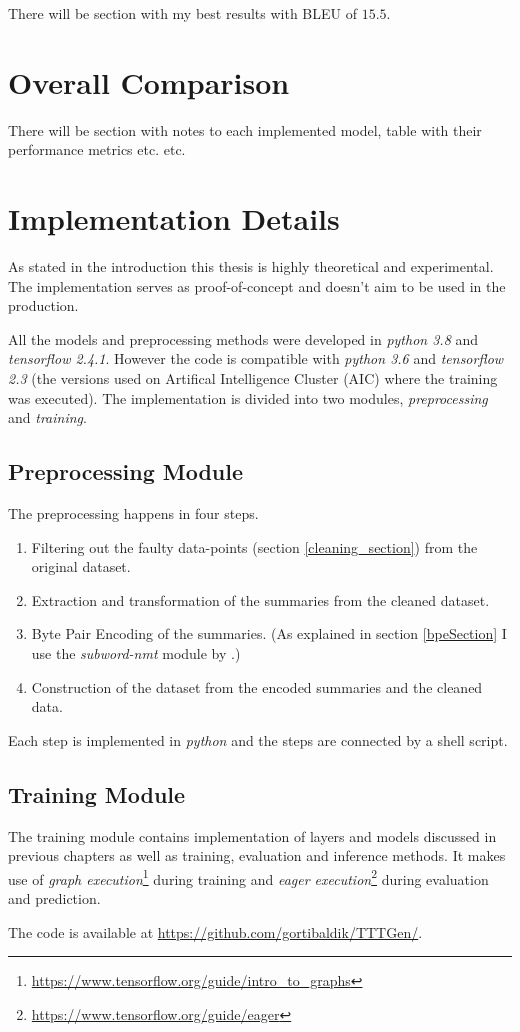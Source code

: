 There will be section with my best results with BLEU of $15.5$.

\section{Overall Comparison}

There will be section with notes to each implemented model, table with their performance metrics etc. etc.

\section{Implementation Details}

As stated in the introduction this thesis is highly theoretical and experimental. The implementation serves as proof-of-concept and doesn't aim to be used in the production.

All the models and preprocessing methods were developed in \emph{python 3.8} and \emph{tensorflow 2.4.1}. However the code is compatible with \emph{python 3.6} and \emph{tensorflow 2.3} (the versions used on Artifical Intelligence Cluster (AIC) where the training was executed). The implementation is divided into two modules, \emph{preprocessing} and \emph{training}.

\subsection{Preprocessing Module}

The preprocessing happens in four steps.
\begin{enumerate}
    \item Filtering out the faulty data-points (section \ref{cleaning_section}) from the original dataset.
    \item Extraction and transformation of the summaries from the cleaned dataset.
    \item Byte Pair Encoding of the summaries. (As explained in section \ref{bpeSection} I use the \emph{subword-nmt} module by \citep{sennrich2016}.)
    \item Construction of the dataset from the encoded summaries and the cleaned data. 
\end{enumerate}
Each step is implemented in \emph{python} and the steps are connected by a shell script.

\subsection{Training Module}

The training module contains implementation of layers and models discussed in previous chapters as well as training, evaluation and inference methods. It makes use of \emph{graph execution}\footnote{\url{https://www.tensorflow.org/guide/intro_to_graphs}} during training and \emph{eager execution}\footnote{\url{https://www.tensorflow.org/guide/eager}} during evaluation and prediction.

The code is available at \url{https://github.com/gortibaldik/TTTGen/}.